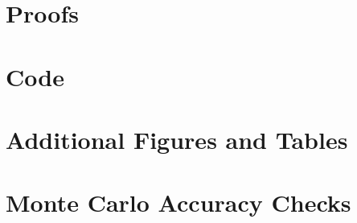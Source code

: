 \documentclass[12pt,a4paper]{article}
\theoremstyle{definition}
\theoremstyle{plain}
\theoremstyle{remark}
\theoremstyle{plain}
\begin{document}
\newpage

\clearpage
{}


\clearpage
\appendix

\section{Proofs}
\section{Code}
\section{Additional Figures and Tables}
\section{Monte Carlo Accuracy Checks}
\end{document}
